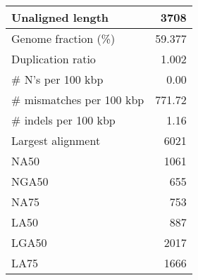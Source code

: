 \documentclass[12pt,a4paper]{article}
\begin{document}
\begin{table}[ht]
\begin{center}
\begin{tabular}{|l*{1}{|r}|}
Unaligned length & 3708 \\ \hline
Genome fraction (\%) & 59.377 \\ \hline
Duplication ratio & 1.002 \\ \hline
\# N's per 100 kbp & 0.00 \\ \hline
\# mismatches per 100 kbp & 771.72 \\ \hline
\# indels per 100 kbp & 1.16 \\ \hline
Largest alignment & 6021 \\ \hline
NA50 & 1061 \\ \hline
NGA50 & 655 \\ \hline
NA75 & 753 \\ \hline
LA50 & 887 \\ \hline
LGA50 & 2017 \\ \hline
LA75 & 1666 \\ \hline
\end{tabular}
\end{center}
\end{table}
\end{document}
